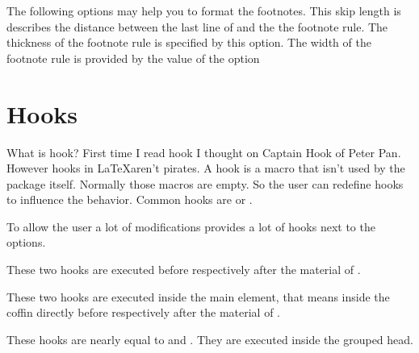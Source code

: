 \documentclass[openany,12pt,tocdepth=3]{ltx-md}
\begin{document}
The following options may help you to format the footnotes.
This skip length is describes the distance between 
the last line of  and the the footnote rule.
The thickness of the footnote rule is specified by this option.
The width of the footnote rule is provided by the value of the option 




\section{Hooks}\label{sec:hook}
What is hook? First time I read hook I thought on Captain Hook of Peter Pan.
However hooks in \LaTeX aren't pirates. 
A hook is a macro that isn't used by the package itself. Normally those
macros are empty. So the user can redefine hooks to influence the
behavior. Common hooks are  or .

To allow the user a lot of modifications  provides a lot of hooks next to the options.

These two hooks are executed before  respectively after the material 
of . 

These two hooks are executed inside the main element, that means
inside the coffin directly before respectively after the material
of . 


These hooks are nearly equal to  and .
They are executed inside the grouped head.
\end{document}
